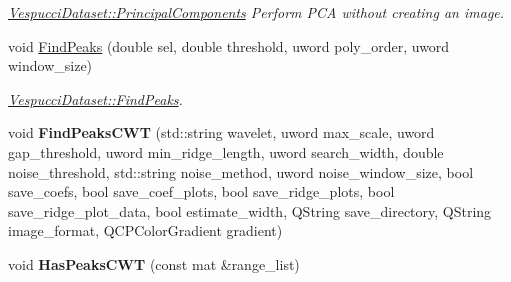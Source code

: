 \begin{DoxyCompactItemize}
\begin{DoxyCompactList}\small\item\em \hyperlink{class_vespucci_dataset_ab4c52da3f8281aa7c7cec96f12f20fca}{Vespucci\+Dataset\+::\+Principal\+Components} Perform P\+C\+A without creating an image. \end{DoxyCompactList}\item 
void \hyperlink{class_vespucci_dataset_a1f8933230496f1b3f475a884a021c6e5}{Find\+Peaks} (double sel, double threshold, uword poly\+\_\+order, uword window\+\_\+size)
\begin{DoxyCompactList}\small\item\em \hyperlink{class_vespucci_dataset_a1f8933230496f1b3f475a884a021c6e5}{Vespucci\+Dataset\+::\+Find\+Peaks}. \end{DoxyCompactList}\item 
\hypertarget{class_vespucci_dataset_ac0e50ce0c06f3cc95d02f79eaa777f0e}{void {\bfseries Find\+Peaks\+C\+W\+T} (std\+::string wavelet, uword max\+\_\+scale, uword gap\+\_\+threshold, uword min\+\_\+ridge\+\_\+length, uword search\+\_\+width, double noise\+\_\+threshold, std\+::string noise\+\_\+method, uword noise\+\_\+window\+\_\+size, bool save\+\_\+coefs, bool save\+\_\+coef\+\_\+plots, bool save\+\_\+ridge\+\_\+plots, bool save\+\_\+ridge\+\_\+plot\+\_\+data, bool estimate\+\_\+width, Q\+String save\+\_\+directory, Q\+String image\+\_\+format, Q\+C\+P\+Color\+Gradient gradient)}\label{class_vespucci_dataset_ac0e50ce0c06f3cc95d02f79eaa777f0e}

\item 
\hypertarget{class_vespucci_dataset_acc179b1759c4b54d55cb3b99dfefa0e2}{void {\bfseries Has\+Peaks\+C\+W\+T} (const mat \&range\+\_\+list)}\label{class_vespucci_dataset_acc179b1759c4b54d55cb3b99dfefa0e2}


\end{DoxyCompactItemize}
